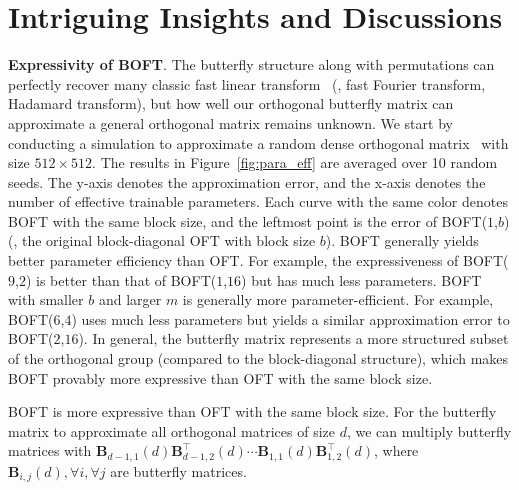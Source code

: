 \vspace{-1.65mm}
\section{Intriguing Insights and Discussions}
\vspace{-1.65mm}


\textbf{Expressivity of BOFT}. The butterfly structure along with permutations can perfectly recover many classic fast linear transform~\cite{dao2019learning,dao2019kaleidoscope} (\eg, fast Fourier transform, Hadamard transform), but how well our orthogonal butterfly matrix can approximate a general orthogonal matrix remains unknown. We start by conducting a simulation to approximate a random dense orthogonal matrix~\cite{anderson1987generation} with size $512\times 512$. The results in Figure~\ref{fig:para_eff} are averaged over 10 random seeds. The y-axis denotes the approximation error, and the x-axis denotes the number of effective trainable parameters. Each curve with the same color denotes BOFT with the same block size, and the leftmost point is the error of BOFT($1$,$b$) (\ie, the original block-diagonal OFT with block size $b$). BOFT generally yields better parameter efficiency than OFT. For example, the expressiveness of BOFT($9$,$2$) is better than that of BOFT($1$,$16$) but has much less parameters. BOFT with smaller $b$ and larger $m$ is generally more parameter-efficient. For example, BOFT($6$,$4$) uses much less parameters but yields a similar approximation error to BOFT($2$,$16$). In general, the butterfly matrix represents a more structured subset of the orthogonal group (compared to the block-diagonal structure), which makes BOFT provably more expressive than OFT with the same block size.

\vspace{0.9mm}
\begin{theorem}\label{thm:exp_boft}
    BOFT is more expressive than OFT with the same block size. For the butterfly matrix to approximate all orthogonal matrices of size $d$, we can multiply butterfly matrices with  $\bm{B}_{d-1,1}(d)\bm{B}^\top_{d-1,2}(d)\cdots\bm{B}_{1,1}(d)\bm{B}^\top_{1,2}(d)$, where $\bm{B}_{i,j}(d),\forall i,\forall j$ are butterfly matrices.
\end{theorem}
\vspace{-1.1mm}


